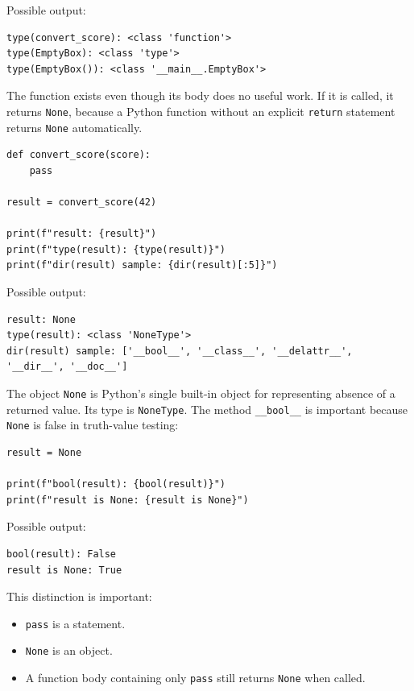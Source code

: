 Possible output:

\begin{verbatim}
type(convert_score): <class 'function'>
type(EmptyBox): <class 'type'>
type(EmptyBox()): <class '__main__.EmptyBox'>
\end{verbatim}

The function exists even though its body does no useful work. If it is called, it returns \texttt{None}, because a Python function without an explicit \texttt{return} statement returns \texttt{None} automatically.

\begin{verbatim}
def convert_score(score):
    pass

result = convert_score(42)

print(f"result: {result}")
print(f"type(result): {type(result)}")
print(f"dir(result) sample: {dir(result)[:5]}")
\end{verbatim}

Possible output:

\begin{verbatim}
result: None
type(result): <class 'NoneType'>
dir(result) sample: ['__bool__', '__class__', '__delattr__', '__dir__', '__doc__']
\end{verbatim}

The object \texttt{None} is Python's single built-in object for representing absence of a returned value. Its type is \texttt{NoneType}. The method \texttt{\_\_bool\_\_} is important because \texttt{None} is false in truth-value testing:

\begin{verbatim}
result = None

print(f"bool(result): {bool(result)}")
print(f"result is None: {result is None}")
\end{verbatim}

Possible output:

\begin{verbatim}
bool(result): False
result is None: True
\end{verbatim}

This distinction is important:

\begin{itemize}
    \item \texttt{pass} is a statement.
    \item \texttt{None} is an object.
    \item A function body containing only \texttt{pass} still returns \texttt{None} when called.
\end{itemize}

